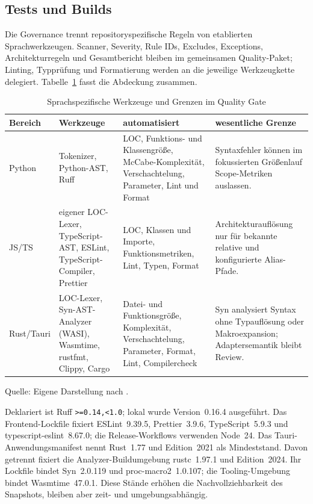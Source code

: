 \subsection{Tests und Builds}
\label{subsec:tests-builds}

Die Governance trennt repositoryspezifische Regeln von etablierten
Sprachwerkzeugen. Scanner, Severity, Rule IDs, Excludes, Exceptions,
Architekturregeln und Gesamtbericht bleiben im gemeinsamen Quality-Paket;
Linting, Typprüfung und Formatierung werden an die jeweilige Werkzeugkette
delegiert. Tabelle~\ref{tab:quality-language-tools} fasst die Abdeckung
zusammen.

\begin{table}[H]
  \centering
  \scriptsize
  \renewcommand{\arraystretch}{1.08}
  \caption{Sprachspezifische Werkzeuge und Grenzen im Quality Gate}
  \label{tab:quality-language-tools}
  \begin{tabularx}{\textwidth}{@{}p{}p{}>{\raggedright\arraybackslash}X p{}@{}}
    \toprule
    \textbf{Bereich} & \textbf{Werkzeuge} & \textbf{automatisiert} &
      \textbf{wesentliche Grenze} \\
    \midrule
    Python & Tokenizer, Python-AST, Ruff & LOC, Funktions- und Klassengröße,
      McCabe-Komplexität, Verschachtelung, Parameter, Lint und Format &
      Syntaxfehler können im fokussierten Größenlauf Scope-Metriken auslassen. \\
    JS/TS & eigener LOC-Lexer, TypeScript-AST, ESLint, TypeScript-Compiler,
      Prettier & LOC, Klassen und Importe, Funktionsmetriken, Lint, Typen,
      Format & Architekturauflösung nur für bekannte relative und konfigurierte
      Alias-Pfade. \\
    Rust/Tauri & LOC-Lexer, Syn-AST-Analyzer (WASI), Wasmtime, rustfmt,
      Clippy, Cargo & Datei- und Funktionsgröße, Komplexität, Verschachtelung,
      Parameter, Format, Lint, Compilercheck & Syn analysiert Syntax ohne
      Typauflösung oder Makroexpansion; Adaptersemantik bleibt Review. \\
    \bottomrule
  \end{tabularx}
  \smallskip
  {\footnotesize Quelle: Eigene Darstellung nach
  \textcite{kleiveist2026quality-implementation}.\par}
\end{table}

Deklariert ist Ruff \texttt{>=0.14,<1.0}; lokal wurde Version~0.16.4
ausgeführt. Das Frontend-Lockfile fixiert ESLint~9.39.5, Prettier~3.9.6,
TypeScript~5.9.3 und typescript-eslint~8.67.0; die Release-Workflows verwenden
Node~24. Das Tauri-Anwendungsmanifest nennt Rust~1.77 und Edition~2021 als
Mindeststand. Davon getrennt fixiert die Analyzer-Buildumgebung rustc~1.97.1
und Edition~2024. Ihr Lockfile bindet Syn~2.0.119 und proc-macro2~1.0.107; die
Tooling-Umgebung bindet Wasmtime~47.0.1. Diese Stände erhöhen die
Nachvollziehbarkeit des Snapshots, bleiben aber zeit- und umgebungsabhängig.

